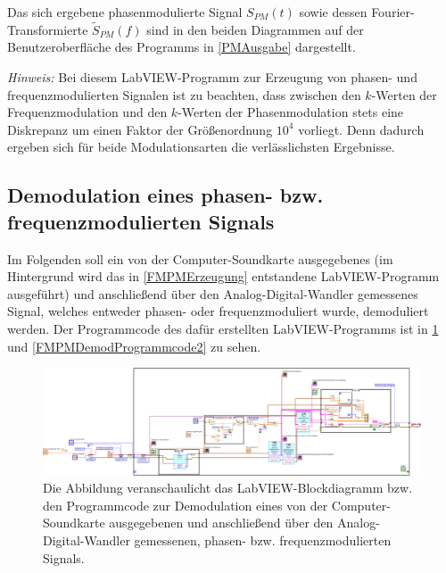 \documentclass[
a4paper,
12pt,
pagesize,
ngerman
]{scrartcl}
\begin{document}
	\noindent Das sich ergebene phasenmodulierte Signal $S_{PM}(t)$ sowie dessen Fourier-Transformierte $\tilde{S}_{PM}(f)$ sind in den beiden Diagrammen auf der Benutzeroberfläche des Programms in \cref{PMAusgabe} dargestellt.
	
	\emph{Hinweis:} Bei diesem LabVIEW-Programm zur Erzeugung von phasen- und frequenzmodulierten Signalen ist zu beachten, dass zwischen den $k$-Werten der Frequenzmodulation und den $k$-Werten der Phasenmodulation stets eine Diskrepanz um einen Faktor der Größenordnung $10^4$ vorliegt.
	Denn dadurch ergeben sich für beide Modulationsarten die verlässlichsten Ergebnisse.
		
	
	
		
	\subsection{Demodulation eines phasen- bzw. frequenzmodulierten Signals} \label{FMPMDemodulation} %
	
	
	Im Folgenden soll ein von der Computer-Soundkarte ausgegebenes (im Hintergrund wird das in \cref{FMPMErzeugung} entstandene LabVIEW-Programm ausgeführt) und anschließend über den Analog-Digital-Wandler gemessenes Signal, welches entweder phasen- oder frequenzmoduliert wurde, demoduliert werden. 
	Der Programmcode des dafür erstellten LabVIEW-Programms ist in \cref{FMPMDemodProgrammcode1} und \cref{FMPMDemodProgrammcode2} zu sehen.
	
	\begin{figure}[H]
		\centering
		\includegraphics[width=1.0\textwidth]{EIRE2018Dateien/Tag4/OsziFMPM-Demod/FM/OsziPlusFMPMd}
		\caption{Die Abbildung veranschaulicht das LabVIEW-Blockdiagramm bzw. den Programmcode zur Demodulation eines von der Computer-Soundkarte ausgegebenen und anschließend über den Analog-Digital-Wandler gemessenen, phasen- bzw. frequenzmodulierten Signals.}
		\label{FMPMDemodProgrammcode1}
	\end{figure}
	
\end{document}
